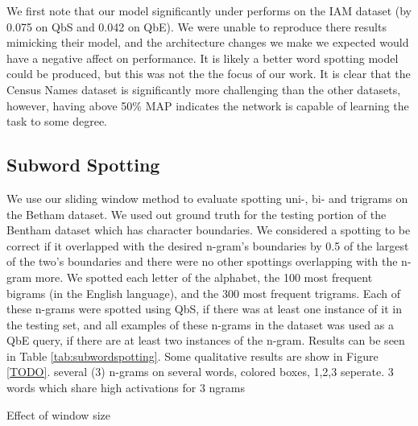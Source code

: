 \documentclass[ms,electronic,twosidetoc,letterpaper,chaptercenter,parttop,lol,lof,lot]{byumsphd}
\begin{document}


We first note that our model significantly under performs \cite{sudholt2016} on the IAM dataset (by 0.075 on QbS and 0.042 on QbE). We were unable to reproduce there results mimicking their model, and the architecture changes we make we expected would have a negative affect on performance. It is likely a better word spotting model could be produced, but this was not the the focus of our work.
It is clear that the Census Names dataset is significantly more challenging than the other datasets, however, having above 50\% MAP indicates the network is capable of learning the task to some degree.

\subsection{Subword Spotting}

We use our sliding window method to evaluate spotting uni-, bi- and trigrams on the Betham dataset. We used out ground truth for the testing portion of the Bentham dataset which has character boundaries. We considered a spotting to be correct if it overlapped with the desired n-gram's boundaries by 0.5 of the largest of the two's boundaries and there were no other spottings overlapping with the n-gram more. 
We spotted each letter of the alphabet, the 100 most frequent bigrams (in the English language), and the 300 most frequent trigrams. Each of these n-grams were spotted using QbS, if there was at least one instance of it in the testing set, and all examples of these n-grams in the dataset was used as a QbE query, if there are at least two instances of the n-gram.
Results can be seen in Table \ref{tab:subwordspotting}.
Some qualitative results are show in Figure \ref{TODO}. several (3) n-grams on several words, colored boxes, 1,2,3 seperate. 3 words which share high activations for 3 ngrams

Effect of window size %


\end{document}
